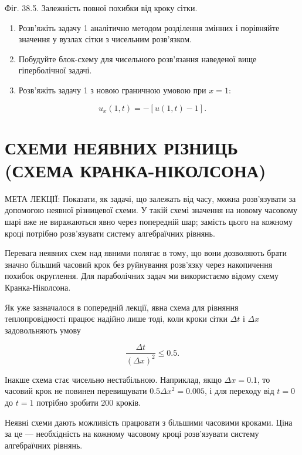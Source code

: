 \documentclass[
  ukrainian,
]{article}
\begin{document}
Фіг. 38.5. Залежність повної похибки від кроку сітки.

\begin{enumerate}
\def\labelenumi{\arabic{enumi}.}
\setcounter{enumi}{1}
\item
  Розв'яжіть задачу 1 аналітично методом розділення змінних і порівняйте
  значення у вузлах сітки з чисельним розв'язком.
\item
  Побудуйте блок-схему для чисельного розв'язання наведеної вище
  гіперболічної задачі.
\item
  Розв'яжіть задачу 1 з новою граничною умовою при \(x=1\):
\end{enumerate}

\[u_x(1,t)=-\left[u(1,t)-1\right].\]

\section{СХЕМИ НЕЯВНИХ РІЗНИЦЬ (СХЕМА
КРАНКА-НІКОЛСОНА)}\label{ux441ux445ux435ux43cux438-ux43dux435ux44fux432ux43dux438ux445-ux440ux456ux437ux43dux438ux446ux44c-ux441ux445ux435ux43cux430-ux43aux440ux430ux43dux43aux430-ux43dux456ux43aux43eux43bux441ux43eux43dux430}

МЕТА ЛЕКЦІЇ: Показати, як задачі, що залежать від часу, можна
розв'язувати за допомогою неявної різницевої схеми. У такій схемі
значення на новому часовому шарі вже не виражаються явно через
попередній шар; замість цього на кожному кроці потрібно розв'язувати
систему алгебраїчних рівнянь.

Перевага неявних схем над явними полягає в тому, що вони дозволяють
брати значно більший часовий крок без руйнування розв'язку через
накопичення похибок округлення. Для параболічних задач ми використаємо
відому схему Кранка-Ніколсона.

Як уже зазначалося в попередній лекції, явна схема для рівняння
теплопровідності працює надійно лише тоді, коли кроки сітки \(\Delta t\)
і \(\Delta x\) задовольняють умову

\[\frac{\Delta t}{(\Delta x)^2}\le 0.5.\]

Інакше схема стає чисельно нестабільною. Наприклад, якщо
\(\Delta x=0.1\), то часовий крок не повинен перевищувати
\(0.5\Delta x^2=0.005\), і для переходу від \(t=0\) до \(t=1\) потрібно
зробити 200 кроків.

Неявні схеми дають можливість працювати з більшими часовими кроками.
Ціна за це --- необхідність на кожному часовому кроці розв'язувати
систему алгебраїчних рівнянь.
\end{document}
